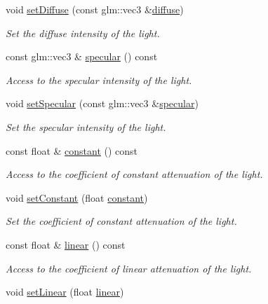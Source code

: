 \begin{DoxyCompactItemize}
void \hyperlink{classSpotLight_a20a505694de0025c8595cd2ff8876ba8}{set\+Diffuse} (const glm\+::vec3 \&\hyperlink{classSpotLight_a84be0450fb59905a908b6e09f16bb2e7}{diffuse})
\begin{DoxyCompactList}\small\item\em Set the diffuse intensity of the light. \end{DoxyCompactList}\item 
const glm\+::vec3 \& \hyperlink{classSpotLight_a2dd83ce57f35badb6c0147bf0aa56b02}{specular} () const 
\begin{DoxyCompactList}\small\item\em Access to the specular intensity of the light. \end{DoxyCompactList}\item 
void \hyperlink{classSpotLight_a9e602b8df45447032985f839c3ff9a3c}{set\+Specular} (const glm\+::vec3 \&\hyperlink{classSpotLight_a2dd83ce57f35badb6c0147bf0aa56b02}{specular})
\begin{DoxyCompactList}\small\item\em Set the specular intensity of the light. \end{DoxyCompactList}\item 
const float \& \hyperlink{classSpotLight_a950b700c0244974abac7a5985674f4c5}{constant} () const 
\begin{DoxyCompactList}\small\item\em Access to the coefficient of constant attenuation of the light. \end{DoxyCompactList}\item 
void \hyperlink{classSpotLight_aff5255b08bba012f85fdde5d070129ee}{set\+Constant} (float \hyperlink{classSpotLight_a950b700c0244974abac7a5985674f4c5}{constant})
\begin{DoxyCompactList}\small\item\em Set the coefficient of constant attenuation of the light. \end{DoxyCompactList}\item 
const float \& \hyperlink{classSpotLight_ac55d82286a1219c99a32be7d996a5e7b}{linear} () const 
\begin{DoxyCompactList}\small\item\em Access to the coefficient of linear attenuation of the light. \end{DoxyCompactList}\item 
void \hyperlink{classSpotLight_a14852dde240213108b56be911841b09d}{set\+Linear} (float \hyperlink{classSpotLight_ac55d82286a1219c99a32be7d996a5e7b}{linear})

\end{DoxyCompactItemize}
